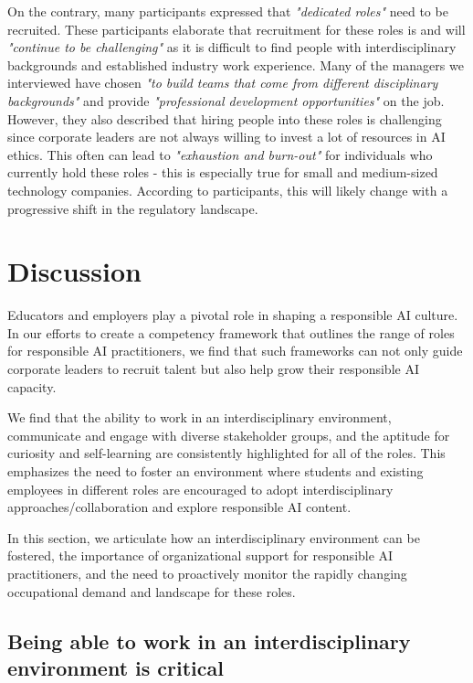 \documentclass[sigconf]{acmart}
\begin{document}
On the contrary, many participants expressed that \textit{"dedicated roles"} need to be recruited. These participants elaborate that recruitment for these roles is and will \textit{"continue to be challenging"} as it is difficult to find people with interdisciplinary backgrounds and established industry work experience. Many of the managers we interviewed have chosen \textit{"to build teams that come from different disciplinary backgrounds"} and provide \textit{"professional development opportunities"} on the job. However, they also described that hiring people into these roles is challenging since corporate leaders are not always willing to invest a lot of resources in \ac{AI} ethics. This often can lead to \textit{"exhaustion and burn-out"} for individuals who currently hold these roles - this is especially true for small and medium-sized technology companies. According to participants, this will likely change with a progressive shift in the regulatory landscape. 


\section{Discussion}
Educators and employers play a pivotal role in shaping a responsible AI culture. In our efforts to create a competency framework that outlines the range of roles for responsible AI practitioners, we find that such frameworks can not only guide corporate leaders to recruit talent but also help grow their responsible AI capacity.

We find that the ability to work in an interdisciplinary environment, communicate and engage with diverse stakeholder groups, and the aptitude for curiosity and self-learning are consistently highlighted for all of the roles.
This emphasizes the need to foster an environment where students and existing employees in different roles are encouraged to adopt interdisciplinary approaches/collaboration and explore responsible AI content.

In this section, we articulate how an interdisciplinary environment can be fostered, the importance of organizational support for responsible AI practitioners, and the need to proactively monitor the rapidly changing occupational demand and landscape for these roles.

\subsection{Being able to work in an interdisciplinary environment is critical}
\end{document}
